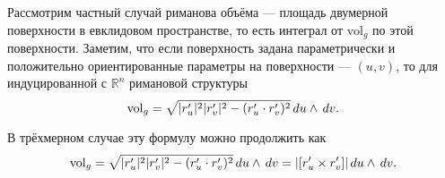 Рассмотрим частный случай риманова объёма --- площадь двумерной поверхности в евклидовом пространстве, то есть интеграл от $\text{vol}_g$ по этой поверхности. Заметим, что если поверхность задана параметрически и положительно ориентированные параметры на поверхности --- $(u,v)$, то для индуцированной с $\mathbb{R}^n$ римановой структуры
\begin{equation*}
	\text{vol}_g = \sqrt{|r_u'|^2 |r_v'|^2 - (r_u' \cdot r_v')^2} \, d u \wedge \, d v.
\end{equation*}

В трёхмерном случае эту формулу можно продолжить как
\begin{equation*}
	\text{vol}_g = \sqrt{|r_u'|^2 |r_v'|^2 - (r_u' \cdot r_v')^2} \, d u \wedge \, d v = |[r_u' \times r_v']| \, d u \wedge \, d v.
\end{equation*}